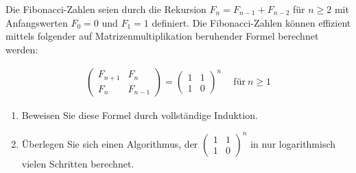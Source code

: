 
\begin{exercise}

Die Fibonacci-Zahlen seien durch die Rekursion $F_n = F_{n-1} + F_{n-2}$ für $n \geq 2$ mit Anfangswerten $F_0 = 0$ und $F_1 = 1$ definiert.
Die Fibonacci-Zahlen können effizient mittels folgender auf Matrizenmultiplikation beruhender Formel berechnet werden:

\begin{align*}
  \begin{pmatrix}
    F_{n+1} & F_n \\
    F_n     & F_{n-1}
  \end{pmatrix}
  =
  \begin{pmatrix}
    1 & 1 \\
    1 & 0
  \end{pmatrix}^n
  \quad
  ~\text{für}~
  n \geq 1
\end{align*}

\begin{enumerate}[label = \alph*.]

  \item Beweisen Sie diese Formel durch vollständige Induktion.

  \item Überlegen Sie sich einen Algorithmus, der
  $\begin{pmatrix}
    1 & 1 \\
    1 & 0
  \end{pmatrix}^n$
  in nur logarithmisch vielen Schritten berechnet.

\end{enumerate}

\end{exercise}


